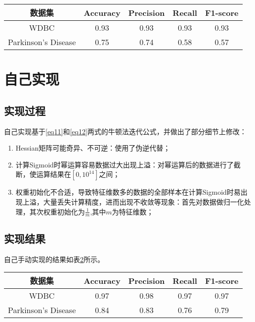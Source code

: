 \documentclass{SCIS2020cn}
\begin{document}
\begin{table}[]
    \label{tb2}
    \begin{center}
        \begin{tabular}{@{}ccccc@{}}
            \toprule
            数据集                 & Accuracy & Precision & Recall & F1-score \\ \midrule
            WDBC                & 0.93     & 0.93      & 0.93   & 0.93     \\
            Parkinson's Disease & 0.75     & 0.74      & 0.58   & 0.57     \\ \bottomrule
            \end{tabular}
    \end{center}
    \end{table}

\section{自己实现}
\subsection{实现过程}
自己实现基于\ref{eq11}和\ref{eq12}两式的牛顿法迭代公式，并做出了部分细节上修改：

\begin{enumerate}
    \item Hessian矩阵可能奇异、不可逆：使用了伪逆代替；
    \item 计算Sigmoid时幂运算容易数据过大出现上溢：对幂运算后的数据进行了截断，使运算结果在$[0,10^{14}]$之间；
    \item 权重初始化不合适，导致特征维数多的数据的全部样本在计算Sigmoid时易出现上溢，大量丢失计算精度，进而出现不收敛等现象：首先对数据做归一化处理，其次权重初始化为$\frac{1}{m}$,其中$m$为特征维数；
\end{enumerate}

\subsection{实现结果}
自己手动实现的结果如表\ref{tb3}所示。
\begin{table}[]
    \label{tb3}
    \begin{center}
        \begin{tabular}{@{}ccccc@{}}
            \toprule
            数据集                 & Accuracy & Precision & Recall & F1-score \\ \midrule
            WDBC                & 0.97     & 0.98      & 0.97   & 0.97     \\
            Parkinson's Disease & 0.84     & 0.83      & 0.76   & 0.79     \\ \bottomrule
            \end{tabular}
    \end{center}
\end{table}
\end{document}
